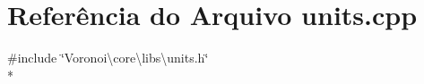 \section{Referência do Arquivo units.\+cpp}
\label{units_8cpp}
{\ttfamily \#include \char`\"{}Voronoi\textbackslash{}core\textbackslash{}libs\textbackslash{}units.\+h\char`\"{}}\\*
